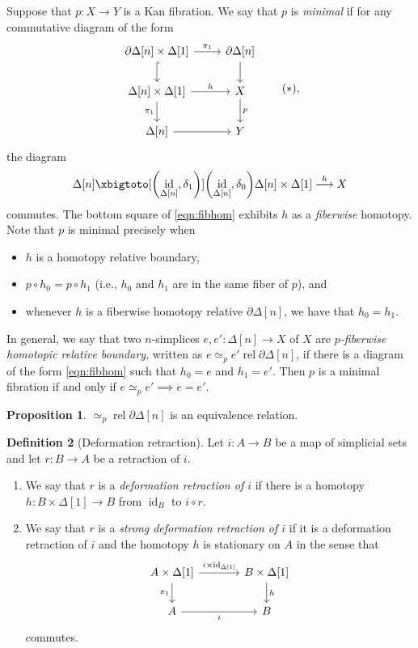 \documentclass[10pt,letterpaper,cm]{nupset}
\theoremstyle{definition}
\newtheorem{definition}{Definition}[subsection]
\theoremstyle{theorem}
\newtheorem{prop}[definition]{Proposition}
\theoremstyle{remark}
\newcommand{\0}{\mathbf{0}}
\newcommand{\1}{\mathbf{1}}
\newcommand{\2}{\mathbf{2}}
\DeclareMathOperator{\idd}{id}
\DeclareMathOperator{\rel}{rel}
\newcommand{\bi}{\begin{itemize}}
\newcommand{\ei}{\end{itemize}}
\newcommand{\be}{\begin{enumerate}}
\newcommand{\ee}{\end{enumerate}}
\begin{document}
\medskip

Suppose that $p: X \to Y$ is a Kan fibration. We say that $p$ is \textit{minimal} if for any commutative diagram of the form
\[
\begin{tikzcd} \label{eqn:fibhom}
{\partial{\Delta[n]}\times \Delta[1]} \arrow[d, hook] \arrow[r, "\pi_1"] & {\partial{\Delta[n]}} \arrow[d] \\
{\Delta[n]  \times \Delta[1]} \arrow[d, "\pi_1"'] \arrow[r, "h"]   & X \arrow[d, "p"]                \\
{\Delta[n]} \arrow[r]                                              & Y                              
\end{tikzcd} \tag{$\ast$}
,\]
the diagram
\[ 
\Delta[n]  \xbigtoto[\left(\idd_{\Delta[n]}, \delta_1\right)]{\left(\idd_{\Delta[n]}, \delta_0\right)} \Delta[n]\times \Delta[1] \overset{h}{\longrightarrow} X
\] commutes. The bottom square of \eqref{eqn:fibhom} exhibits $h$ as a \textit{fiberwise} homotopy. Note that $p$ is minimal precisely when
\bi
\item $h$ is a homotopy relative boundary,
\item  $p\circ h_0 =p\circ h_1$ (i.e., $h_0$ and $h_1$ are in the same fiber of $p$), and
\item  whenever $h$ is a fiberwise homotopy relative $\partial{\Delta[n]}$, we have that $h_0 = h_1$.
\ei

In general, we say that two $n$-simplices $e, e' : \Delta[n] \to X$ of $X$ are \textit{$p$-fiberwise homotopic relative boundary}, written as $e \simeq_p e' \rel{\partial{\Delta[n]}}$, if there is a diagram of the form \eqref{eqn:fibhom} such that $h_0=e$ and $h_1=e'$.
Then $p$ is a minimal fibration if and only if $e \simeq_p e' \implies e=e'$.

\begin{prop}
$\simeq_p{}\rel{\partial{\Delta[n]}}$ is an equivalence relation.
\end{prop}

\smallskip


\begin{definition}[Deformation retraction]\label{defret}
Let $i: A \to B$ be a map of simplicial sets and let $r: B \to A$ be a retraction of $i$.
\be
\item We say that $r$ is a \textit{deformation retraction of $i$} if there is a homotopy $h: B \times \Delta[1] \to B$ from $\idd_B$ to $i \circ r$.
\pagebreak
\item We say that $r$ is a \textit{strong deformation retraction of $i$} if it is a deformation retraction of $i$ and the homotopy $h$ is stationary on $A$ in the sense that 
\[
\begin{tikzcd}[column sep=large]
{A\times \Delta[1]} \arrow[r, "{i\times \idd_{\Delta[1]}}"] \arrow[d, "\pi_1"'] & {B\times \Delta[1]} \arrow[d, "h"] \\
A \arrow[r, "i"']                                                               & B                                 
\end{tikzcd}
\] commutes.
\ee
\end{definition}
\end{document}
